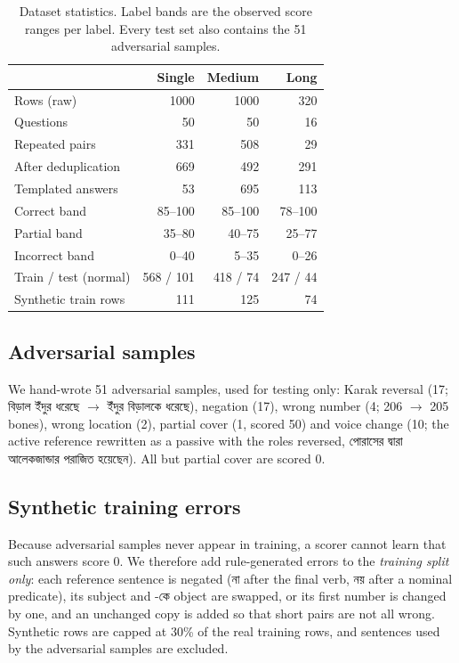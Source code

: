 \documentclass[10pt,a4paper,twocolumn]{article}
\newcommand{\bn}[1]{{\bengalifont #1}}
\begin{document}
\begin{table}[t]
\centering\small
\begin{tabular}{lrrr}
\toprule
 & Single & Medium & Long \\
\midrule
Rows (raw) & 1000 & 1000 & 320 \\
Questions & 50 & 50 & 16 \\
Repeated pairs & 331 & 508 & 29 \\
After deduplication & 669 & 492 & 291 \\
Templated answers & 53 & 695 & 113 \\
Correct band & 85--100 & 85--100 & 78--100 \\
Partial band & 35--80 & 40--75 & 25--77 \\
Incorrect band & 0--40 & 5--35 & 0--26 \\
\midrule
Train / test (normal) & 568 / 101 & 418 / 74 & 247 / 44 \\
Synthetic train rows & 111 & 125 & 74 \\
\bottomrule
\end{tabular}
\caption{Dataset statistics. Label bands are the observed score ranges per label. Every test set also contains the 51 adversarial samples.}
\label{tab:data}
\end{table}

\subsection{Adversarial samples}
We hand-wrote 51 adversarial samples, used for testing only: Karak reversal
(17; \bn{বিড়াল ইঁদুর ধরেছে} $\rightarrow$ \bn{ইঁদুর বিড়ালকে ধরেছে}),
negation (17), wrong number (4; 206 $\rightarrow$ 205 bones), wrong location
(2), partial cover (1, scored 50) and voice change (10; the active reference
rewritten as a passive with the roles reversed, \bn{পোরাসের দ্বারা
আলেকজান্ডার পরাজিত হয়েছেন}). All but partial cover are scored 0.

\subsection{Synthetic training errors}
Because adversarial samples never appear in training, a scorer cannot learn
that such answers score 0. We therefore add rule-generated errors to the
\emph{training split only}: each reference sentence is negated (\bn{না} after
the final verb, \bn{নয়} after a nominal predicate), its subject and
\bn{-কে} object are swapped, or its first number is changed by one, and an
unchanged copy is added so that short pairs are not all wrong. Synthetic rows
are capped at 30\% of the real training rows, and sentences used by the
adversarial samples are excluded.
\end{document}
